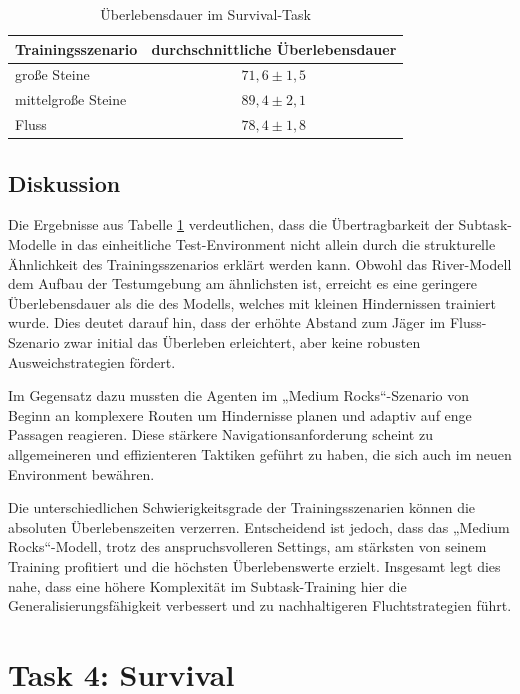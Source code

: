\begin{table}[h]
  \centering
  \caption{Überlebensdauer im Survival-Task}
  \begin{tabular}{@{}l c@{}}
    \toprule
    Trainingsszenario &
      \multicolumn{1}{c}{durchschnittliche Überlebensdauer} \\ \midrule
    große Steine   & $71,6 \pm 1,5$ \\
    mittelgroße Steine  & $89,4 \pm 2,1$ \\
    Fluss          & $78,4 \pm 1,8$ \\ 
    \bottomrule
  \end{tabular}
  \label{tab:survival_comparison}
\end{table}


\subsection{Diskussion}
Die Ergebnisse aus Tabelle \ref{tab:survival_comparison} verdeutlichen, dass die Übertragbarkeit der Subtask-Modelle in das einheitliche Test-Environment nicht allein durch die strukturelle Ähnlichkeit des Trainingsszenarios erklärt werden kann. Obwohl das River-Modell dem Aufbau der Testumgebung am ähnlichsten ist, erreicht es eine geringere Überlebensdauer als die des Modells, welches mit kleinen Hindernissen trainiert wurde. Dies deutet darauf hin, dass der erhöhte Abstand zum Jäger im Fluss-Szenario zwar initial das Überleben erleichtert, aber keine robusten Ausweichstrategien fördert. 

Im Gegensatz dazu mussten die Agenten im „Medium Rocks“-Szenario von Beginn an komplexere Routen um Hindernisse planen und adaptiv auf enge Passagen reagieren. Diese stärkere Navigationsanforderung scheint zu allgemeineren und effizienteren Taktiken geführt zu haben, die sich auch im neuen Environment bewähren. 

Die unterschiedlichen Schwierigkeitsgrade der Trainingsszenarien können die absoluten Überlebenszeiten verzerren. Entscheidend ist jedoch, dass das „Medium Rocks“-Modell, trotz des anspruchsvolleren Settings, am stärksten von seinem Training profitiert und die höchsten Überlebenswerte erzielt. Insgesamt legt dies nahe, dass eine höhere Komplexität im Subtask-Training hier die Generalisierungsfähigkeit verbessert und zu nachhaltigeren Fluchtstrategien führt.


\section{Task 4: Survival}
\label{sec:survival}
